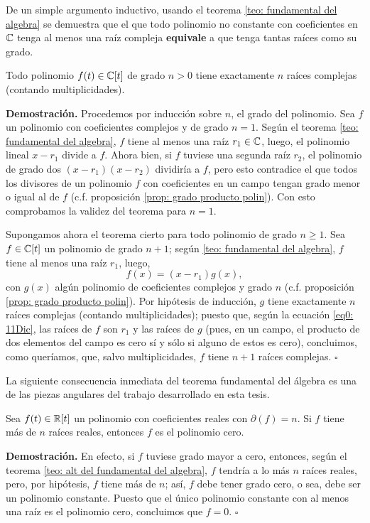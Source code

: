 De un simple argumento inductivo, usando el teorema 
\ref{teo: fundamental del algebra} se demuestra que 
el que 
todo polinomio no constante con coeficientes en $\mathbb{C}$
tenga al menos una raíz compleja \textbf{equivale} a que
tenga tantas raíces como su grado.

\begin{teo}
\label{teo: alt del fundamental del algebra}
Todo polinomio $f(t) \in \mathbb{C}[t]$ 
de grado $n>0$
tiene exactamente $n$ raíces complejas
(contando multiplicidades).
\end{teo}
\noindent
\textbf{Demostración.}
Procedemos por inducción sobre $n$, el grado del polinomio.
Sea $f$ un polinomio con coeficientes
complejos y de grado $n=1$. Según el teorema 
\ref{teo: fundamental del algebra}, $f$ tiene al menos
una raíz $r_{1} \in \mathbb{C}$, luego,
el polinomio lineal $x-r_{1}$
divide a $f$. Ahora bien, si $f$ tuviese una segunda
raíz $r_{2}$, el polinomio 
de grado dos $(x-r_{1})(x-r_{2})$
dividiría a $f$, pero esto contradice el que 
todos los divisores de un polinomio $f$ con coeficientes
en un campo tengan grado menor o igual al de $f$
(c.f. proposición \ref{prop: grado producto polin}). 
Con esto comprobamos la validez del teorema para $n=1$.

Supongamos ahora el teorema cierto para 
todo polinomio de grado
$n \geq 1$.
Sea $f \in \mathbb{C}[t]$ un polinomio de grado $n+1$; según 
\ref{teo: fundamental del algebra}, $f$ tiene al menos
una raíz $r_{1}$, luego,
\begin{equation}
\label{eq0: 11Dic}
f(x)= (x-r_{1}) g(x), 
\end{equation}
con $g(x)$ algún polinomio de coeficientes complejos y grado
$n$ (c.f. proposición \ref{prop: grado producto polin}). 
Por hipótesis de inducción, $g$ tiene exactamente
$n$ raíces complejas (contando multiplicidades); puesto que,
según la ecuación \eqref{eq0: 11Dic}, las raíces de $f$
son $r_{1}$ y las raíces de $g$ (pues, en un campo, el producto
de dos elementos del campo es cero sí y sólo si alguno de 
estos es cero), concluimos, como queríamos, que, salvo
multiplicidades, $f$ tiene $n+1$ raíces complejas.
\null\nobreak\hfill\ensuremath{\square} 
\vspace{0.2cm}

La siguiente consecuencia inmediata del teorema fundamental del
álgebra es 
una de las piezas angulares del trabajo desarrollado en esta tesis.

\begin{prop}
\label{prop: cita TFA}
Sea $f(t) \in \mathbb{R}[t]$ un polinomio con coeficientes reales
con $\partial(f) = n$. Si $f$ tiene más de $n$ raíces reales, entonces
$f$ es el polinomio cero.
\end{prop}
\noindent
\textbf{Demostración.}
En efecto, si $f$ tuviese grado mayor a cero, entonces, 
según el teorema \ref{teo: alt del fundamental del algebra},
$f$ tendría a lo más $n$ raíces reales,
pero, por hipótesis, $f$ tiene más de $n$; así, $f$
debe tener grado cero, o sea, debe  ser un polinomio constante.
Puesto que el único polinomio constante con al menos una raíz
es el polinomio cero, concluimos que $f=0$.
\null\nobreak\hfill\ensuremath{\square} %
\vspace{0.2cm}